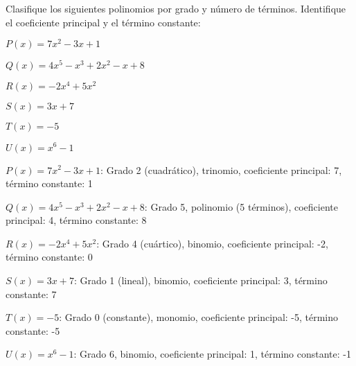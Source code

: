 \begin{exercise}
\problem Clasifique los siguientes polinomios por grado y número de términos. Identifique el coeficiente principal y el término constante:

\begin{exerciselist}
    \item $P(x) = 7x^2 - 3x + 1$
    \item $Q(x) = 4x^5 - x^3 + 2x^2 - x + 8$
    \item $R(x) = -2x^4 + 5x^2$
    \item $S(x) = 3x + 7$
    \item $T(x) = -5$
    \item $U(x) = x^6 - 1$
\end{exerciselist}

\begin{solucion}
\begin{exerciselist}
    \item $P(x) = 7x^2 - 3x + 1$: Grado 2 (cuadrático), trinomio, coeficiente principal: 7, término constante: 1
    
    \item $Q(x) = 4x^5 - x^3 + 2x^2 - x + 8$: Grado 5, polinomio (5 términos), coeficiente principal: 4, término constante: 8
    
    \item $R(x) = -2x^4 + 5x^2$: Grado 4 (cuártico), binomio, coeficiente principal: -2, término constante: 0
    
    \item $S(x) = 3x + 7$: Grado 1 (lineal), binomio, coeficiente principal: 3, término constante: 7
    
    \item $T(x) = -5$: Grado 0 (constante), monomio, coeficiente principal: -5, término constante: -5
    
    \item $U(x) = x^6 - 1$: Grado 6, binomio, coeficiente principal: 1, término constante: -1
\end{exerciselist}
\end{solucion}
\end{exercise}

